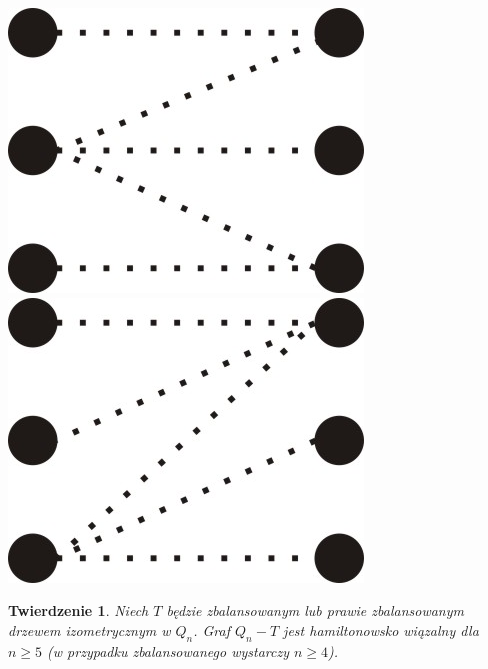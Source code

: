 \documentclass{pracamgr}
\newtheorem{theorem}{Twierdzenie}[chapter]
\begin{document}
     \begin{center}
      \includegraphics[scale=0.5]{img/Q_hamilton_t1.jpg}\quad\quad\quad\quad
      \includegraphics[scale=0.5]{img/Q_hamilton_t2.jpg}
     \end{center}
    \begin{theorem}\label{Hamilton - drzewo izo}
     Niech $T$ będzie zbalansowanym lub prawie zbalansowanym drzewem izometrycznym w $Q_n$. Graf $Q_n-T$ jest hamiltonowsko wiązalny dla $n\ge5$
     (w przypadku zbalansowanego wystarczy $n\ge4$).
    \end{theorem}
\end{document}
